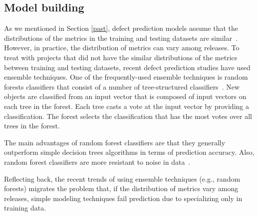 \subsection{Model building}
As we mentioned in Section \ref{past}, defect prediction models assume that the distributions of the metrics in the training and testing datasets are similar~\cite{Turhan2009ESE}. However, in practice, the distribution of metrics can vary among releases. 
To treat with projects that did not have the similar distributions of the metrics between training and testing datasets, recent defect prediction studies have used ensemble techniques.
One of the frequently-used ensemble techniques is random forests classifiers that consist of a number of tree-structured classifiers~\cite{Guo2004ISSRE,mende2009,Kamei2010ICSM}. New objects are classified from an input vector that is composed of input vectors on each tree in the forest. Each tree casts a vote at the input vector by providing a classification. The forest selects the classification that has the most votes over all trees in the forest.

The main advantages of random forest classifiers are that they generally outperform simple decision trees algorithms in terms of prediction accuracy. Also, random forest classifiers are more resistant to noise in data~\cite{Marks2011PROMISE}.

Reflecting back, the recent trends of using ensemble techniques (e.g., random forests) migrates the problem that, if the distribution of metrics vary among releases, simple modeling techniques fail prediction due to specializing only in training data.


